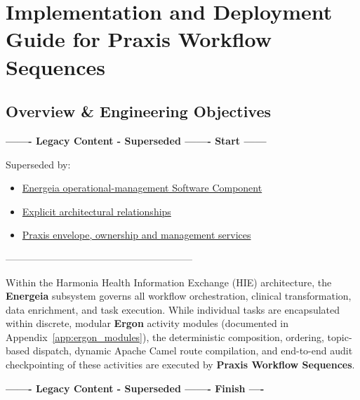 
\chapter{Implementation and Deployment Guide for Praxis Workflow Sequences}
\label{app:praxis_workflow}

\section{Overview \& Engineering Objectives}
\label{sec:praxis_guide_overview}

\par\noindent\textbf{------- Legacy Content - Superseded ------- Start ------}
\par\noindent Superseded by:
\begin{itemize}
  \item \href{../../markdown/05-information-systems-architecture/component-register.md\#c39}{Energeia operational-management Software Component}
  \item \href{../../markdown/05-information-systems-architecture/candidate-system-map.md\#specialisation-and-reuse}{Explicit architectural relationships}
  \item \href{../../markdown/05-information-systems-architecture/pathways-journeys-and-handoff.md\#praxis-operational-context}{Praxis envelope, ownership and management services}
\end{itemize}
\noindent ---------------------------------------------------------

Within the Harmonia Health Information Exchange (HIE) architecture, the \textbf{Energeia} subsystem governs all workflow orchestration, clinical transformation, data enrichment, and task execution. While individual tasks are encapsulated within discrete, modular \textbf{Ergon} activity modules (documented in Appendix~\ref{app:ergon_modules}), the deterministic composition, ordering, topic-based dispatch, dynamic Apache Camel route compilation, and end-to-end audit checkpointing of these activities are executed by \textbf{Praxis Workflow Sequences}.

\par\noindent\textbf{------- Legacy Content - Superseded ------- Finish ----}


